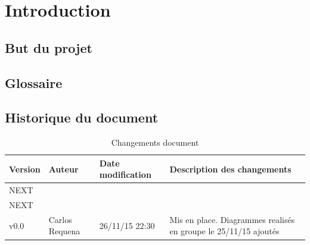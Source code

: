 \documentclass[11pt,a4paper]{article}
\begin{document}
    
    \pagestyle{empty}
\tableofcontents
\newpage
\pagestyle{fancy}

\setcounter{page}{1}

\section{Introduction}
\label{sec:intro}



\subsection{But du projet}
\label{sec:but}


\subsection{Glossaire}
\label{sec:glo}





\subsection{Historique du document}
\label{sec:hist}






\begin{table}[h]
  \centering
  \begin{tabular}[ht]{|l|l|l|p{18em}|}
    \hline

    \textbf{Version}
    & \textbf{Auteur}
    & \textbf{Date modification}
    & \textbf{Description des changements}\\ \hline \hline
    NEXT &  &  &  \\ \hline
    NEXT &  &  &  \\ \hline
    v0.0 & Carlos Requena & 26/11/15 22:30
    & Mis en place. Diagrammes realisés en groupe le 25/11/15 ajoutés\\ \hline
  \end{tabular}
  \caption{Changements document}
  \label{tab:hist}
\end{table}
\end{document}
